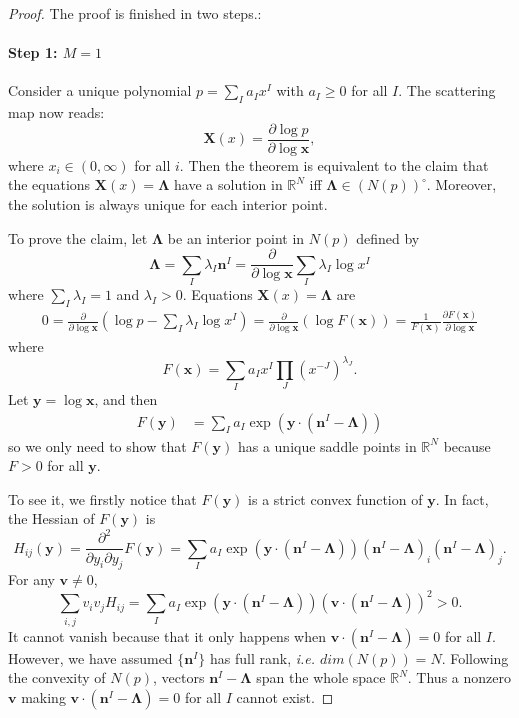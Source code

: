 \documentclass[12pt]{article}
\theoremstyle{definition}
\theoremstyle{plain}
\begin{document}
\begin{proof}
	

The proof is finished in two steps.:
\paragraph{Step 1: $M=1$}
Consider a unique polynomial $p=\sum_{I} a_I x^I$ with $a_I\geq 0$ for all $I$. The scattering map now reads:
\[
	\mathbf X(x)=\frac{\partial \log p}{\partial \log \mathbf x},
\]
where $x_i\in (0,\infty)$ for all $i$. Then the theorem is equivalent to the claim that the equations $\mathbf X(x)=\mathbf\Lambda$ have a solution in $\mathbb R^N$ iff $\mathbf\Lambda\in (N(p))^\circ$. Moreover, the solution is always unique for each interior point.


To prove the claim, let $\mathbf{\Lambda}$ be an interior point in $N(p)$ defined by 
\[
	\mathbf \Lambda=\sum_{I}\lambda_I\mathbf n^I
	=\frac{\partial}{\partial \log \mathbf x}\sum_{I}\lambda_I \log x^I
\]
where $\sum_I \lambda_I=1$ and $\lambda_I > 0$. Equations $\mathbf X(x)=\mathbf \Lambda$ are 
\[
\begin{aligned}
	0=\frac{\partial }{\partial \log \mathbf x}\left(
	\log p-\sum_{I}\lambda_I \log x^I
	\right)=\frac{\partial }{\partial \log \mathbf x}\left(
	\log F(\mathbf x)
	\right)=\frac{1}{F(\mathbf x)}\frac{\partial F(\mathbf x)}{\partial \log \mathbf x}
\end{aligned}
\]
where
\[
	F(\mathbf x)=\sum_I a_I x^I\prod_J (x^{-J})^{\lambda_J}.
\]
Let $\mathbf y=\log \mathbf x$, and then
\[
	\begin{aligned}
		F(\mathbf y)
		&=\sum_I a_I \exp\left(\mathbf{y}\cdot \left(\mathbf{n}^I-\mathbf{\Lambda}\right)\right)
	\end{aligned}
\]
so we only need to show that $F(\mathbf y)$ has a unique saddle points in $\mathbb R^N$ because $F>0$ for all $\mathbf y$.

 To see it, we firstly notice that $F(\mathbf y)$ is a strict convex function of $\mathbf y$. In fact, the Hessian of $F(\mathbf y)$ is 
\[
	H_{ij}(\mathbf y)=\frac{\partial^2}{\partial y_i\partial y_j}F(\mathbf y)=\sum_I a_I \exp\left(\mathbf{y}\cdot \left(\mathbf{n}^I-\mathbf{\Lambda}\right)\right)\left(\mathbf{n}^I-\mathbf{\Lambda}\right)_i\left(\mathbf{n}^I-\mathbf{\Lambda}\right)_j.
\]
For any $\mathbf v\neq 0$, 
\[
	\sum_{i,j}v_iv_jH_{ij}=\sum_I a_I \exp\left(\mathbf{y}\cdot \left(\mathbf{n}^I-\mathbf{\Lambda}\right)\right) \left(\mathbf v\cdot (\mathbf{n}^I-\mathbf{\Lambda})\right)^2 >0.
\]
It cannot vanish because that it only happens when $\mathbf v\cdot (\mathbf{n}^I-\mathbf{\Lambda})=0$ for all $I$. However, we have assumed $\{\mathbf n^I\}$ has full rank, {\it i.e. $dim(N(p))=N$}. Following the convexity of $N(p)$, vectors $\mathbf{n}^I-\mathbf{\Lambda}$ span the whole space $\mathbb R^N$. Thus a nonzero $\mathbf v$  making $\mathbf v\cdot (\mathbf{n}^I-\mathbf{\Lambda})=0$ for all $I$ cannot exist.


\end{proof}
\end{document}
